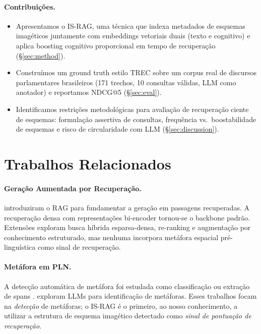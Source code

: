 \documentclass[11pt,a4paper]{article}
\begin{document}
\paragraph{Contribuições.}
\begin{itemize}[noitemsep,topsep=2pt]
  \item Apresentamos o IS-RAG, uma técnica que indexa metadados de
        esquemas imagéticos juntamente com embeddings vetoriais duais
        (texto e cognitivo) e aplica boosting cognitivo proporcional
        em tempo de recuperação (\S\ref{sec:method}).
  \item Construímos um ground truth estilo TREC sobre um corpus real de
        discursos parlamentares brasileiros (171 trechos, 10 consultas
        válidas, LLM como anotador) e reportamos NDCG@5 (\S\ref{sec:eval}).
  \item Identificamos restrições metodológicas para avaliação de
        recuperação ciente de esquemas: formulação assertiva de consultas,
        frequência vs.\ boostabilidade de esquemas e risco de circularidade
        com LLM (\S\ref{sec:discussion}).
\end{itemize}

\section{Trabalhos Relacionados}
\label{sec:related}

\paragraph{Geração Aumentada por Recuperação.}
\citet{lewis2020rag} introduziram o RAG para fundamentar a geração em
passagens recuperadas.
A recuperação densa com representações bi-encoder
\citep{karpukhin2020dpr} tornou-se o backbone padrão.
Extensões exploram busca híbrida esparsa-densa, re-ranking e augmentação
por conhecimento estruturado, mas nenhuma incorpora metáfora espacial
pré-linguística como sinal de recuperação.

\paragraph{Metáfora em PLN.}
A detecção automática de metáfora foi estudada como classificação ou
extração de spans \citep{shutova2010,tsvetkov2014}.
\citet{wachowiak2023,wachowiak-gromann-2022-systematic} exploram LLMs
para identificação de metáforas.
Esses trabalhos focam na \emph{detecção} de metáforas; o IS-RAG é o
primeiro, ao nosso conhecimento, a utilizar a estrutura de esquema
imagético detectado como \emph{sinal de pontuação de recuperação}.
\end{document}
